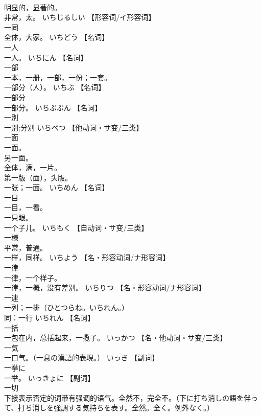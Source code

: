 \documentclass[8pt]{extreport}
\begin{document}
\begin{CJK}{UTF8}{min}
\\	明显的，显著的。 
\\	非常，太。	いちじるしい		【形容词/イ形容词】
\\	一同	
\\	全体，大家。	いちどう		【名词】
\\	一人	
\\	一人。	いちにん		【名词】
\\	一部	
\\	一本，一册，一部，一份；一套。 
\\	一部分（人）。	いちぶ		【名词】
\\	一部分	
\\	一部分。	いちぶぶん		【名词】
\\	一別	
\\	一别;分别	いちべつ		【他动词・サ变/三类】
\\	一面	
\\	一面。 
\\	另一面。 
\\	全体，满，一片。 
\\	第一版（面），头版。 
\\	一张；一面。	いちめん		【名词】
\\	一目	
\\	一目，一看。 
\\	一只眼。 
\\	一个子儿。	いちもく		【自动词・サ变/三类】
\\	一様	
\\	平常，普通。 
\\	一样，同样。	いちよう		【名・形容动词/ナ形容词】
\\	一律	
\\	一律，一个样子。 
\\	一律，一概，没有差别。	いちりつ		【名・形容动词/ナ形容词】
\\	一連	
\\	一列；一排（ひとつらね。いちれん。） 
\\	同：一行	いちれん		【名词】
\\	一括	
\\	一包在内，总括起来，一揽子。	いっかつ		【名・他动词・サ变/三类】
\\	一気	
\\	一口气。（一息の漢語的表現。）	いっき		【副词】
\\	一挙に	
\\	一举。	いっきょに		【副词】
\\	一切	
\\	下接表示否定的词带有强调的语气。全然不，完全不。（下に打ち消しの語を伴って、打ち消しを強調する気持ちを表す。全然。全く。例外なく。） 

\end{CJK}
\end{document}
